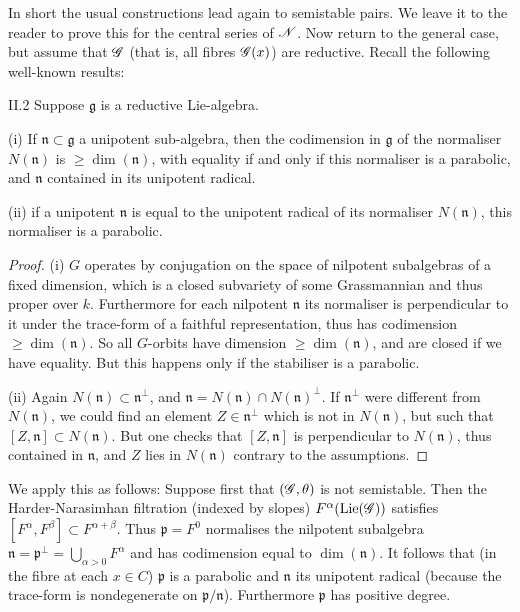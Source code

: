 \documentclass[12pt,english]{smfart}
\theoremstyle{plain} \newtheorem{innerthm}{Theorem} \newtheorem{innerlem}{Lemma} \newtheorem{innerprop}{Proposition} \newtheorem{innercor}{Corollary} \theoremstyle{definition} \newtheorem{innerdefn}{Definition} \newtheorem{innerconstr}{Construction} \theoremstyle{remark} \newtheorem*{remark}{Remark} \newtheorem*{remarks}{Remarks} \newtheorem*{applications}{Applications}
\begin{document}
In short the usual constructions lead again to semistable pairs. We leave it to the reader to prove this for the central series of $\mathscr{N}$. Now return to the
general case, but assume that $\mathscr{G}$ (that is, all fibres $\mathscr{G}(x)$) are reductive. Recall the following well-known results:

\begin{lemma}{II.2}\label{lem:II.2}
Suppose $\mathfrak{g}$ is a reductive Lie-algebra.

(i) If $\mathfrak{n}\subset\mathfrak{g}$ a unipotent sub-algebra, then the codimension in $\mathfrak{g}$ of the normaliser $N(\mathfrak{n})$ is $\ge\dim(\mathfrak{n})$, with equality if and only if this normaliser is a parabolic, and $\mathfrak{n}$ contained in its unipotent radical.

(ii) if a unipotent $\mathfrak{n}$ is equal to the unipotent radical of its normaliser $N(\mathfrak{n})$, this normaliser is a parabolic.
\end{lemma}

\begin{proof}
(i) $G$ operates by conjugation on the space of nilpotent subalgebras of a fixed dimension, which is a closed subvariety of some Grassmannian and thus proper over $k$. Furthermore for each nilpotent $\mathfrak{n}$ its normaliser is perpendicular to it under the trace-form of a faithful representation, thus has codimension $\ge\dim(\mathfrak{n})$. So all $G$-orbits have dimension $\ge\dim(\mathfrak{n})$, and are closed if we have equality. But this happens only if the stabiliser is a parabolic.

(ii) Again $N(\mathfrak{n})\subset\mathfrak{n}^\perp$, and $\mathfrak{n}=N(\mathfrak{n})\cap N(\mathfrak{n})^\perp$. If $\mathfrak{n}^\perp$ were different from $N(\mathfrak{n})$, we could find an element $Z\in\mathfrak{n}^\perp$ which is not in $N(\mathfrak{n})$, but such that $[Z,\mathfrak{n}]\subset N(\mathfrak{n})$. But one checks that $[Z,\mathfrak{n}]$ is perpendicular to $N(\mathfrak{n})$, thus contained in $\mathfrak{n}$, and $Z$ lies in $N(\mathfrak{n})$ contrary to the assumptions.
\end{proof}

We apply this as follows: Suppose first that $(\mathscr{G},\theta)$ is not semistable. Then the Harder-Narasimhan filtration (indexed by slopes) $F^\alpha(\operatorname{Lie}(\mathscr{G}))$ satisfies $[F^\alpha,F^\beta]\subset F^{\alpha+\beta}$. Thus $\mathfrak{p}=F^0$ normalises the nilpotent subalgebra $\mathfrak{n}=\mathfrak{p}^\perp=\bigcup_{\alpha>0}F^\alpha$ and has codimension equal to $\dim(\mathfrak{n})$. It follows that (in the fibre at each $x\in C$) $\mathfrak{p}$ is a parabolic and $\mathfrak{n}$ its unipotent radical (because the trace-form is nondegenerate on $\mathfrak{p}/\mathfrak{n}$). Furthermore $\mathfrak{p}$ has positive degree.
\end{document}
